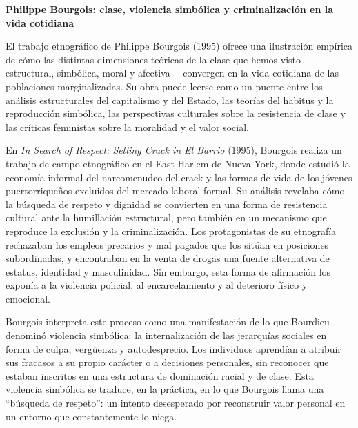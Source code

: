 \documentclass[
  spanish,
  letterpaper,
  DIV=11,
  numbers=noendperiod]{scrreprt}
\begin{document}
\begin{tcolorbox}[enhanced jigsaw, bottomtitle=1mm, toprule=.15mm, colbacktitle=quarto-callout-note-color!10!white, bottomrule=.15mm, leftrule=.75mm, colframe=quarto-callout-note-color-frame, opacitybacktitle=0.6, titlerule=0mm, breakable, colback=white, left=2mm, arc=.35mm, title=\textcolor{quarto-callout-note-color}{\faInfo}\hspace{0.5em}{Nota}, toptitle=1mm, coltitle=black, rightrule=.15mm, opacityback=0]

\textbf{Philippe Bourgois: clase, violencia simbólica y criminalización
en la vida cotidiana}

El trabajo etnográfico de Philippe Bourgois (1995) ofrece una
ilustración empírica de cómo las distintas dimensiones teóricas de la
clase que hemos visto ---estructural, simbólica, moral y afectiva---
convergen en la vida cotidiana de las poblaciones marginalizadas. Su
obra puede leerse como un puente entre los análisis estructurales del
capitalismo y del Estado, las teorías del habitus y la reproducción
simbólica, las perspectivas culturales sobre la resistencia de clase y
las críticas feministas sobre la moralidad y el valor social.

En \emph{In Search of Respect: Selling Crack in El Barrio} (1995),
Bourgois realiza un trabajo de campo etnográfico en el East Harlem de
Nueva York, donde estudió la economía informal del narcomenudeo del
crack y las formas de vida de los jóvenes puertorriqueños excluidos del
mercado laboral formal. Su análisis revelaba cómo la búsqueda de respeto
y dignidad se convierten en una forma de resistencia cultural ante la
humillación estructural, pero también en un mecanismo que reproduce la
exclusión y la criminalización. Los protagonistas de su etnografía
rechazaban los empleos precarios y mal pagados que los sitúan en
posiciones subordinadas, y encontraban en la venta de drogas una fuente
alternativa de estatus, identidad y masculinidad. Sin embargo, esta
forma de afirmación los exponía a la violencia policial, al
encarcelamiento y al deterioro físico y emocional.

Bourgois interpreta este proceso como una manifestación de lo que
Bourdieu denominó violencia simbólica: la internalización de las
jerarquías sociales en forma de culpa, vergüenza y autodesprecio. Los
individuos aprendían a atribuir sus fracasos a su propio carácter o a
decisiones personales, sin reconocer que estaban inscritos en una
estructura de dominación racial y de clase. Esta violencia simbólica se
traduce, en la práctica, en lo que Bourgois llama una ``búsqueda de
respeto'': un intento desesperado por reconstruir valor personal en un
entorno que constantemente lo niega.


\end{tcolorbox}
\end{document}
